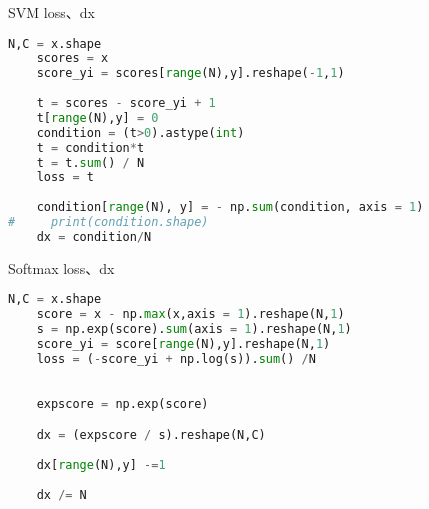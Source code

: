 \documentclass[a4paper]{article}
\begin{document}
SVM loss、dx
\begin{lstlisting}[language=Python, caption=SVM loss、dx]
    N,C = x.shape
    scores = x
    score_yi = scores[range(N),y].reshape(-1,1)
    
    t = scores - score_yi + 1
    t[range(N),y] = 0
    condition = (t>0).astype(int)
    t = condition*t
    t = t.sum() / N
    loss = t
    
    condition[range(N), y] = - np.sum(condition, axis = 1)
#     print(condition.shape)
    dx = condition/N 
\end{lstlisting}
Softmax loss、dx
\begin{lstlisting}[language=Python, caption=Softmax loss、dx]
    N,C = x.shape
    score = x - np.max(x,axis = 1).reshape(N,1)
    s = np.exp(score).sum(axis = 1).reshape(N,1)
    score_yi = score[range(N),y].reshape(N,1)
    loss = (-score_yi + np.log(s)).sum() /N
    
    
    expscore = np.exp(score)

    dx = (expscore / s).reshape(N,C) 
    
    dx[range(N),y] -=1
    
    dx /= N
\end{lstlisting}
\end{document}
